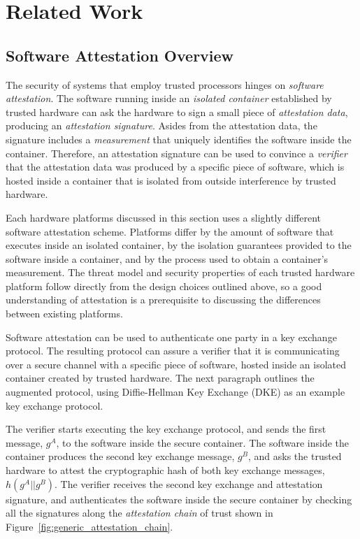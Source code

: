 \section{Related Work}
\label{sec:related}

\subsection{Software Attestation Overview}

The security of systems that employ trusted processors hinges on
\textit{software attestation}. The software running inside an \textit{isolated
container} established by trusted hardware can ask the hardware to sign a
small piece of \textit{attestation data}, producing an
\textit{attestation signature}. Asides from the attestation data, the signature
includes a \textit{measurement} that uniquely identifies the software inside
the container. Therefore, an attestation signature can be used to convince a
\textit{verifier} that the attestation data was produced by a specific piece
of software, which is hosted inside a container that is isolated from outside
interference by trusted hardware.

Each hardware platforms discussed in this section uses a slightly different
software attestation scheme. Platforms differ by the amount of software that
executes inside an isolated container, by the isolation guarantees provided to
the software inside a container, and by the process used to obtain a
container's measurement. The threat model and security properties of each
trusted hardware platform follow directly from the design choices outlined
above, so a good understanding of attestation is a prerequisite to discussing
the differences between existing platforms.

Software attestation can be used to authenticate one party in a key exchange
protocol. The resulting protocol can assure a verifier that it is communicating
over a secure channel with a specific piece of software, hosted inside an
isolated container created by trusted hardware. The next paragraph outlines the
augmented protocol, using Diffie-Hellman Key Exchange (DKE)
\cite{diffie1976keyexchange} as an example key exchange protocol.

The verifier starts executing the key exchange protocol, and sends the first
message, $g^{A}$, to the software inside the secure container. The software
inside the container produces the second key exchange message, $g^{B}$, and
asks the trusted hardware to attest the cryptographic hash of both key exchange
messages, $h(g^{A} || g^{B})$. The verifier receives the second key exchange
and attestation signature, and authenticates the software inside the secure
container by checking all the signatures along the \textit{attestation chain}
of trust shown in Figure~\ref{fig:generic_attestation_chain}.

